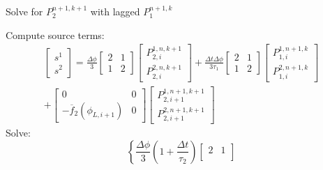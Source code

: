 \documentclass[12pt,a4paper,pagesize=pdftex]{scrartcl}
\begin{document}
\begin{algorithm}[H]
    \caption*{Solve for \(P_2^{n+1,k+1}\) with lagged \(P_1^{n+1,k}\)}
    \begin{algorithmic}
            \STATE Compute source terms:
            \begin{multline*}
                \begin{bmatrix}
                    s^1 \\
                    s^2
                \end{bmatrix}
                = \frac{\Delta \phi}{3}
                \begin{bmatrix}
                    2 & 1 \\
                    1 & 2
                \end{bmatrix}
                \begin{bmatrix}
                    P_{2,i}^{1,n,k+1} \\
                    P_{2,i}^{2,n,k+1}
                \end{bmatrix}
                + \frac{\Delta t \Delta \phi}{3 \tau_1}
                \begin{bmatrix}
                    2 & 1 \\
                    1 & 2
                \end{bmatrix}
                \begin{bmatrix}
                    P_{1,i}^{1,n+1,k} \\
                    P_{1,i}^{2,n+1,k}
                \end{bmatrix} \\
                +
                \begin{bmatrix}
                    0 & 0 \\
                    -\overline{f}_2\left(\phi_{L,i+1}\right) & 0
                \end{bmatrix}
                \begin{bmatrix}
                    P_{2,i+1}^{1,n+1,k+1} \\
                    P_{2,i+1}^{2,n+1,k+1}
                \end{bmatrix}
            \end{multline*}
            \STATE Solve:
            \begin{equation*}
                \left\{ \frac{\Delta \phi}{3} \left(1 + \frac{\Delta t}{\tau_2}\right)
                \begin{bmatrix}
                    2 & 1 \\

\end{bmatrix}
\end{equation*}
\end{algorithmic}
\end{algorithm}
\end{document}
